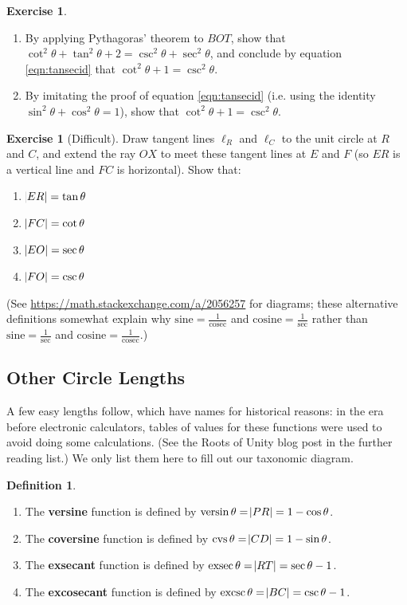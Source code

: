 \documentclass[a4paper,leqno]{article}
\newcommand{\marginsymbol}{\marginpar{\hfill(\ding{43})}}
\numberwithin{equation}{section}
\theoremstyle{definition}
\newtheorem{defn}[equation]{Definition}
\newtheorem{exercise}[equation]{Exercise}
\theoremstyle{remark}
\newcommand{\df}[1]{\textbf{#1}}
\DeclareMathOperator{\versin}{versin}
\DeclareMathOperator{\cvs}{cvs}
\DeclareMathOperator{\exsec}{exsec}
\DeclareMathOperator{\excsc}{excsc}
\begin{document}
\begin{exercise}\leavevmode\marginsymbol
  \begin{enumerate}
    \item By applying Pythagoras' theorem to $ BOT $, show that $ \cot^2 \theta + \tan^2 \theta + 2 = \csc^2 \theta + \sec^2 \theta $,
          and conclude by equation \ref{eqn:tansecid} that $ \cot^2 \theta + 1 = \csc^2 \theta $.
    \item By imitating the proof of equation \ref{eqn:tansecid} (i.e. using the identity $ \sin^2 \theta + \cos^2 \theta = 1 $), show
          that $ \cot^2 \theta + 1 = \csc^2 \theta $.
  \end{enumerate}
\end{exercise}

\begin{exercise}[Difficult]
  Draw tangent lines $ \ell_R $ and $ \ell_C $ to the unit circle at $ R $ and $ C $, and extend the ray $ OX $ to meet these tangent lines
  at $ E $ and $ F $ (so $ ER $ is a vertical line and $ FC $ is horizontal). Show that:
  \begin{enumerate}
    \item $ \abs{ER} = \tan \theta $
    \item $ \abs{FC} = \cot \theta $
    \item $ \abs{EO} = \sec \theta $
    \item $ \abs{FO} = \csc \theta $
  \end{enumerate}
  (See \url{https://math.stackexchange.com/a/2056257} for diagrams; these alternative definitions somewhat
  explain why $ \mathrm{sine} = \frac{1}{\mathrm{cosec}} $ and $ \mathrm{cosine} = \frac{1}{\mathrm{sec}} $ rather
  than $ \mathrm{sine} = \frac{1}{\mathrm{sec}} $ and $ \mathrm{cosine} = \frac{1}{\mathrm{cosec}} $.)
\end{exercise}

\subsection{Other Circle Lengths}
A few easy lengths follow, which have names for historical reasons: in the era before electronic
calculators, tables of values for these functions were used to avoid doing some calculations. (See
the Roots of Unity blog post in the further reading list.) We only list them here to fill out our
taxonomic diagram.
\begin{defn}\leavevmode
  \begin{enumerate}
    \item The \df{versine} function is defined by $ \versin \theta = \abs{PR} = 1 - \cos \theta $.
    \item The \df{coversine} function is defined by $ \cvs \theta = \abs{CD} = 1 - \sin \theta $.
    \item The \df{exsecant} function is defined by $ \exsec \theta = \abs{RT} = \sec \theta - 1 $.
    \item The \df{excosecant} function is defined by $ \excsc \theta = \abs{BC} = \csc \theta - 1$.
  \end{enumerate}
\end{defn}
\end{document}
